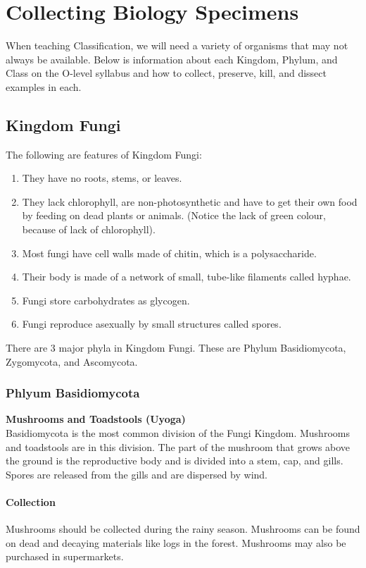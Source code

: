\chapter{Collecting Biology Specimens}

When teaching Classification, we will need a variety of organisms that may not always be available. Below is information about each Kingdom, Phylum, and Class on the O-level syllabus  and how to collect, preserve, kill, and dissect examples in each.

\section{Kingdom Fungi}
The following are features of Kingdom Fungi:
\begin{enumerate}
\item{They have no roots, stems, or leaves.}
\item{They lack chlorophyll, are non-photosynthetic and have to get their own food by feeding on dead plants or animals. (Notice the lack of green colour, because of lack of chlorophyll)}.
\item{Most fungi have cell walls made of chitin, which is a polysaccharide.}
\item{Their body is made of a network of small, tube-like filaments called hyphae.}
\item{Fungi store carbohydrates as glycogen.}
\item{Fungi reproduce asexually by small structures called spores.} 
\end{enumerate}

There are 3 major phyla in Kingdom Fungi. These are Phylum Basidiomycota, Zygomycota, and Ascomycota.
\subsection{Phlyum Basidiomycota}

\textbf{Mushrooms and Toadstools (Uyoga)}\\
Basidiomycota is the most common division of the Fungi Kingdom. Mushrooms and toadstools are in this division. The part of the mushroom that grows above the ground is the reproductive body and is divided into a stem, cap, and gills. Spores are released from the gills and are dispersed by wind.

\subsubsection{Collection}
Mushrooms should be collected during the rainy season. Mushrooms can be found on dead and decaying materials like logs in the forest. Mushrooms may also be purchased in supermarkets.

